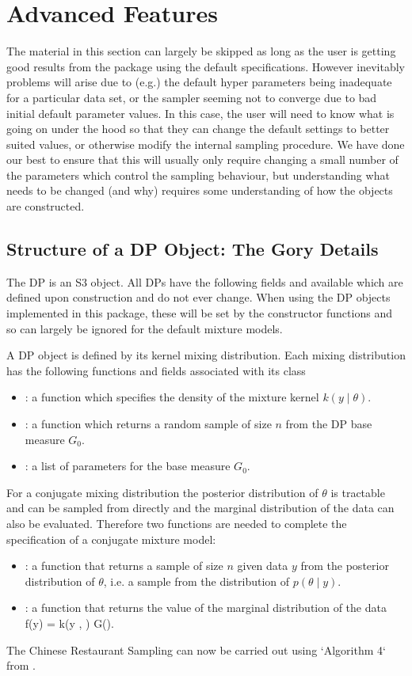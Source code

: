 \documentclass[nojss]{jss}
\begin{document}
\section{Advanced Features}
The material in this section can largely be skipped as long as the user is getting good results from the  package using the default specifications. However inevitably problems will arise due to (e.g.) the default hyper parameters being inadequate for a particular data set, or the sampler seeming not to converge due to bad initial default parameter values. In this case, the user will need to know  what is going on under the hood so that they can change the default settings to better suited values, or otherwise modify the internal sampling procedure. We have done our best to ensure that this will usually only require changing a small number of the parameters which control the sampling behaviour, but understanding what needs to be changed (and why) requires some understanding of how the objects are constructed.

\subsection{Structure of a DP Object: The Gory Details}
The DP is an S3 object. All DPs have the following fields and available which are defined upon construction and do not ever change. When using the DP objects implemented in this package, these will be set by the constructor functions and so can largely be ignored for the default mixture models.

A DP object is defined by its kernel mixing distribution. Each mixing distribution has the following functions and fields associated with its class
\begin{itemize}
\item {}: a function which specifies the density of the mixture kernel $k(y \mid \theta)$.
\item {}: a function which returns a random sample of size $n$ from the DP base measure $G_0$.
\item {}: a list of parameters for the base measure $G_0$.
\end{itemize}

For a conjugate mixing distribution the posterior distribution of $\theta$ is tractable and can be sampled from directly and the marginal distribution of the data can also be evaluated. Therefore two functions are needed to complete the specification of a conjugate mixture model:
\begin{itemize}
\item {}: a function that returns a sample of size $n$ given data $y$ from the posterior distribution of $\theta$, i.e. a sample from the distribution of $p(\theta \mid y)$.
\item {}: a function that returns the value of the marginal distribution of the data f(y) = \int k(y , \theta)  G(\thea).
\end{itemize}
The Chinese Restaurant Sampling can now be carried out using `Algorithm 4` from \cite{neal_markov_2000}.
\end{document}
